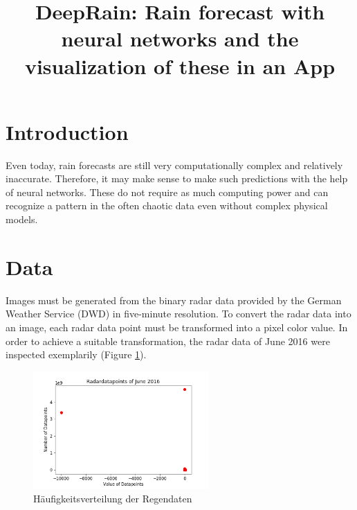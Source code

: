 \documentclass[oneside]{htwg-report}
\begin{document}



\newcommand{\verfasserA}{Simon Christofzik}
\newcommand{\verfasserB}{Paul Sutter}
\newcommand{\verfasserC}{Till Reitlinger}
\newcommand{\thema}{DeepRain: Rain forecast with neural networks and the visualization of these in an App}
\newcommand{\hoschschule}{HTWG Konstanz - University of Applied Sciences}
\newcommand{\institut}{HTWG Konstanz - Institute for Optical Systems}
\newcommand{\prueferA}{Prof. Dr. Oliver Dürr}


\title[Teamprojektthema]{\thema}


\makecover[]


\twocolumn
\section*{Introduction}

\begin{sloppypar}
Even today, rain forecasts are still very computationally complex and relatively inaccurate. 
Therefore, it may make sense to make such predictions with the help of neural networks. 
These do not require as much computing power and can recognize a pattern in the often chaotic data even without complex physical models.
\end{sloppypar}

\section*{Data}\label{data}
Images must be generated from the binary radar data provided by the German Weather Service (DWD) in five-minute resolution.
To convert the radar data into an image, each radar data point must be transformed into a pixel color value.
In order to achieve a suitable transformation, the radar data of June 2016 were inspected exemplarily (Figure \ref{fig:Radardatapoints_of_June_2016}). 

\begin{figure}[ht]
    \centering
    \includegraphics[width=0.6\textwidth,angle=0]{../abb/Radardatapoints_of_June_2016.png}
    \caption[Datenaufbereitung]{Häufigkeitsverteilung der Regendaten}
    \label{fig:Radardatapoints_of_June_2016}
\end{figure}
\end{document}
